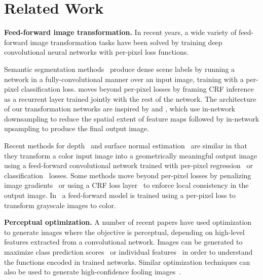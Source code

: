 \documentclass[runningheads]{llncs}
\begin{document}




\section{Related Work}
\textbf{Feed-forward image transformation.}
In recent years, a wide variety of feed-forward image transformation tasks have been solved
by training deep convolutional neural networks with per-pixel loss functions.

Semantic segmentation methods~\cite{long_shelhamer_fcn,eigen2015predicting,farabet2013learning,pinheiro2013recurrent,noh2015learning,zheng2015conditional}
produce dense scene labels by running a network in a fully-convolutional manner over an input
image, training with a per-pixel classification loss. \cite{zheng2015conditional}
moves beyond per-pixel losses by framing CRF inference as a recurrent layer trained jointly with
the rest of the network. The architecture of our transformation networks are inspired by
\cite{long_shelhamer_fcn} and \cite{noh2015learning}, which use in-network downsampling to reduce
the spatial extent of feature maps followed by in-network upsampling to produce the final
output image.

Recent methods for depth~\cite{eigen2015predicting,eigen2014depth,liu2015deep}
and surface normal estimation~\cite{eigen2015predicting,wang2015designing} are similar in
that they transform a color input image into a geometrically meaningful output image
using a feed-forward convolutional network trained with per-pixel
regression~\cite{eigen2014depth,eigen2015predicting} or classification~\cite{wang2015designing}
losses. Some methods move beyond per-pixel losses by penalizing image
gradients~\cite{eigen2015predicting} or using a CRF loss layer~\cite{liu2015deep} to
enforce local consistency in the output image. In~\cite{cheng2015deep} a feed-forward model
is trained using a per-pixel loss to transform grayscale images to color.

\textbf{Perceptual optimization.}
A number of recent papers have used optimization to generate images where the objective
is perceptual, depending on high-level features extracted from a convolutional network.
Images can be generated to maximize class prediction
scores~\cite{simonyan2013deep,yosinski2015understanding} or individual
features~\cite{yosinski2015understanding} in order to understand the functions encoded in
trained networks. Similar optimization techniques can also be used to generate high-confidence
fooling images~\cite{szegedy2013intriguing,nguyen2015deep}.
\end{document}
